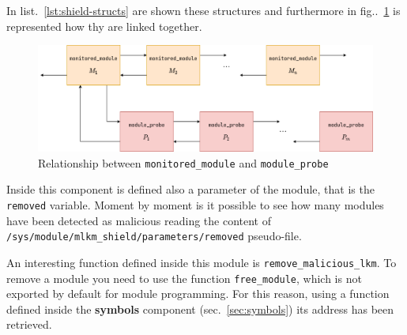 \documentclass{article}
\begin{document}
	In list.~\ref{lst:shield-structs} are shown these structures and furthermore in fig..~\ref{fig:shield-structs} is
	represented how thy are linked together.

	\begin{figure}[!htbp]
		\centering
		\includegraphics[scale=0.4]{shield-structs}
		\caption{Relationship between \texttt{monitored\_module} and \texttt{module\_probe}}
		\label{fig:shield-structs}
	\end{figure}

	

	Inside this component is defined also a parameter of the module, that is the \texttt{removed} variable. Moment by
	moment is it possible to see how many modules have been detected as malicious reading the content of
	\texttt{/sys/module/mlkm\_shield/parameters/removed} pseudo-file.

	An interesting function defined inside this module is \texttt{remove\_malicious\_lkm}. To remove a module you need
	to use the function \texttt{free\_module}, which is not exported by default for module programming. For this
	reason, using a function defined inside the \textbf{symbols} component (sec.~\ref{sec:symbols}) its address has
	been retrieved.
\end{document}
